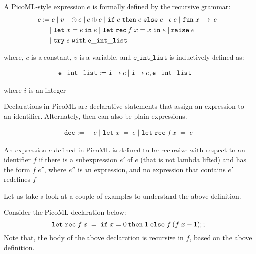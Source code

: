 \begin{definition}
A PicoML-style expression $e$ is formally defined by the recursive grammar:
\begin{equation*}
\begin{split}
e :=& \; c \; | \; v \; | \; \odot e \; | \; e \oplus e \; | \; \ifexp{e}{e}{e} \; | \; e \; e \; | \; \funexp{x}{e} \; \\
  &| \; \letinexp{x}{e}{e} \; | \; \letrecinexp{f}{x}{e}{e}  \; | \; \raiseexp{e} \;\\
  &| \; \mathtt{try} \; e \; \mathtt{with} \; \mathtt{e\_int\_list}
\end{split}
\end{equation*}

where, $c$ is a constant, $v$ is a variable, and $\mathtt{e\_int\_list}$ is inductively defined as:

\begin{equation*}
\begin{split}
\mathtt{e\_int\_list} :=& \; \mathtt{i} \arr e  \; | \; \mathtt{i} \arr e , \mathtt{e\_int\_list}
\end{split}
\end{equation*}

where $i$ is an integer
\end{definition}

\begin{definition}
Declarations in PicoML are declarative statements that assign an expression to an identifier. Alternately, then can also be plain expressions.

\begin{equation*}
\begin{split}
\mathtt{dec} :=& \; e  \; | \; \mathtt{let} \; x \; \mathtt{=} \; e \; | \; \mathtt{let} \; \mathtt{rec} \; f \; x \; \mathtt{=} \; e
\end{split}
\end{equation*}
\end{definition}


\begin{definition}
An expression $e$ defined in PicoML is defined to be recursive with respect to an identifier $f$ if 
there is a subexpression $e'$ of $e$ (that is not lambda lifted) and has the form $f \; e''$, where $e''$ is an expression, 
and no expression that contains $e'$ redefines $f$
\end{definition}

Let us take a look at a couple of examples to understand the above definition.
\begin{example}
Consider the PicoML declaration below:
\[
\mathtt{let} \; \mathtt{rec} \; f \; x \; = \; \ifexp{x = 0}{1}{f \; (f \; x - 1)} ;;
\]
Note that, the body of the above declaration is recursive in $f$, based on the above definition.
 \end{example} 

